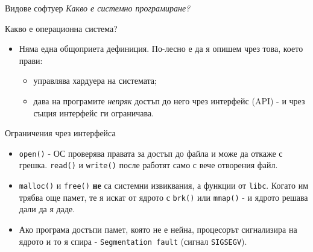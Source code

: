 \documentclass[14pt, aspectratio=169]{beamer}
\begin{document}
\begin{frame}{Видове софтуер}
  \emph{Какво е системно програмиране?}
  \bigskip

\end{frame}

\begin{frame}{Какво е операционна система?}
  \begin{itemize}
    \item Няма една общоприета дефиниция. По-лесно е да я опишем чрез това,
      което прави:
      \begin{itemize}
        \item управлява хардуера на системата;
        \item дава на програмите \emph{непряк} достъп до него чрез интерфейс
          (API) - и чрез същия интерфейс ги ограничава.
      \end{itemize}
  \end{itemize}
\end{frame}

\begin{frame}{Ограничения чрез интерфейса}
  \begin{itemize}
    \item \texttt{open()} - ОС проверява правата за достъп до файла и може да
      откаже с грешка. \texttt{read()} и \texttt{write()} после работят само с
      вече отворения файл.
    \item \texttt{malloc()} и \texttt{free()} \textbf{не} са системни
      извиквания, а функции от \texttt{libc}. Когато им трябва още памет, те я
      искат от ядрото с \texttt{brk()} или \texttt{mmap()} - и ядрото решава
      дали да я даде.
    \item Ако програма достъпи памет, която не е нейна, процесорът сигнализира
      на ядрото и то я спира - \texttt{Segmentation fault} (сигнал
      \texttt{SIGSEGV}).
  \end{itemize}
\end{frame}
\end{document}
